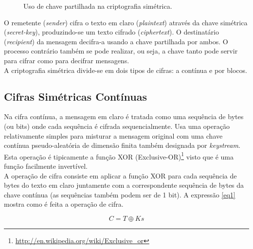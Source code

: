 \documentclass[a4paper,11pt,openright,oneside]{report}
\begin{document}
\begin{figure}[ht]
\center
{}
\caption{Uso de chave partilhada na criptografia simétrica.}
\label{fig:crypto1}
\end{figure}

O remetente (\textit{sender}) cifra o texto em claro (\textit{plaintext}) através da chave simétrica (\textit{secret-key}), produzindo-se um texto cifrado (\textit{ciphertext}). O destinatário (\textit{recipient}) da mensagem decifra-a usando a chave partilhada por ambos. O processo contrário também se pode realizar, ou seja, a chave tanto pode servir para cifrar como para decifrar mensagens.\\

A criptografia simétrica divide-se em dois tipos de cifras: a contínua e por blocos.

\subsection{Cifras Simétricas Contínuas}

Na cifra contínua, a mensagem em claro é tratada como uma sequência de bytes (ou bits) onde cada sequência é cifrada sequencialmente. Usa uma operação relativamente simples para misturar a mensagem original com uma chave contínua pseudo-aleatória de dimensão finita também designada por \textit{keystream}. Esta operação é tipicamente a função XOR (Exclusive-OR)\footnote{\url{http://en.wikipedia.org/wiki/Exclusive_or}} visto que é uma função facilmente invertível.\\

A operação de cifra consiste em aplicar a função XOR para cada sequência de bytes do texto em claro juntamente com a correspondente sequência de bytes da chave contínua (as sequências também podem ser de 1 bit). A expressão \ref{eq1} mostra como é feita a operação de cifra.

\begin{equation}
\label{eq1}
C = T \oplus Ks
\end{equation}
\end{document}
